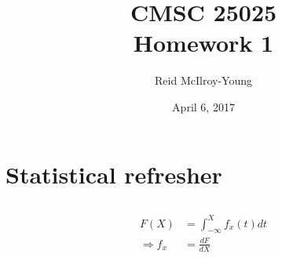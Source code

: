 \documentclass[12pt,a4paper]{article}
\author{Reid McIlroy-Young}
\title{CMSC 25025 \\ Homework 1}
\date{April 6, 2017}
\begin{document}
\maketitle

\section{Statistical refresher}
\subsection{}

\begin{align}
F(X) &= \int_{-\infty}^{X} f_x(t) dt\\
\Rightarrow f_x&= \frac{dF}{dX}
\end{align}
\end{document}
